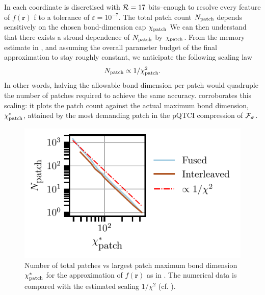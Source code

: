 In  each coordinate is discretised with $\mathcal{R} = 17$ bits--enough to resolve every feature of $f(\boldsymbol{r})$
f to a tolerance of $\varepsilon=10^{-7}$.
The total patch count $N_{\text{patch}}$ depends sensitively on the chosen bond-dimension cap $\chi_{\text{patch}}$
We can then understand that there exists a strond dependence of $N_{\text{patch}}$ by $\chi_{\text{patch}}$. From the memory estimate in , and assuming the overall parameter budget of the final approximation to stay roughly constant, we anticipate the following scaling law
\begin{equation}
	N_{\text{patch}} \propto 1 / \chi_{\text{patch}}^2. 
	\label{eq:scalingNpatchBonddim}
\end{equation}
In other words, halving the allowable bond dimension per patch would quadruple the number of patches required to achieve the same accuracy.
 corroborates this scaling: it plots the patch count against the actual maximum bond dimension, $\chi_{\text{patch}}^*$\footnotemark, attained by the most demanding patch in the pQTCI compression of $\mathcal{F}_{\boldsymbol{\sigma}}$.
\begin{figure}[ht!]
	\centering
	\includegraphics{figures/localFunc_Npatch_vs_Chipatch.pdf}
	\caption{Number of total patches vs largest patch maximum bond dimension $\chi_{\text{patch}}^*$ for the approximation of $f(\boldsymbol{r})$ as in . The numerical data is compared with the estimated scaling $1/\chi^2$ (cf. ).}
	\label{fig:NpatchvsChipatch}
\end{figure}

